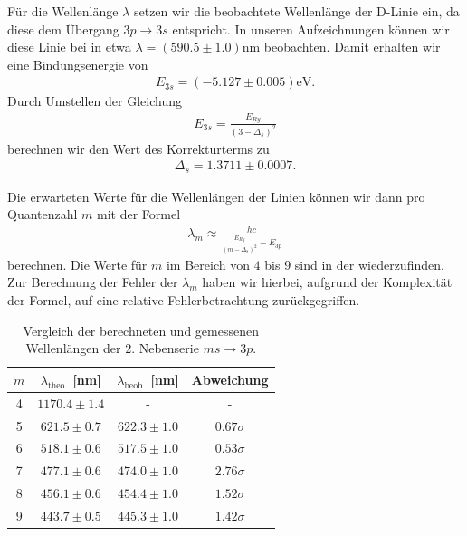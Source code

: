 Für die Wellenlänge $\lambda$ setzen wir die beobachtete Wellenlänge der D-Linie ein, da diese dem Übergang $3p \to 3s$ entspricht. In unseren Aufzeichnungen können wir diese Linie bei in etwa $\lambda = (590.5 \pm 1.0) \si{\nano\meter}$ beobachten. Damit erhalten wir eine Bindungsenergie von
\begin{align}
  E_{3s} = (-5.127 \pm 0.005) \si{\electronvolt}.
\end{align}
Durch Umstellen der Gleichung
\begin{align}
  E_{3s} = \frac{E_{Ry}}{(3 - \Delta_s)^2}
\end{align}
berechnen wir den Wert des Korrekturterms zu
\begin{align}
  \Delta_s = 1.3711 \pm 0.0007.
\end{align}

Die erwarteten Werte für die Wellenlängen der Linien können wir dann pro Quantenzahl $m$ mit der Formel
\begin{align}
  \lambda_m \approx \frac{hc}{\frac{E_{Ry}}{(m - \Delta_s)^2} - E_{3p}}
\end{align}
berechnen. Die Werte für $m$ im Bereich von $4$ bis $9$ sind in der  wiederzufinden. Zur Berechnung der Fehler der $\lambda_m$ haben wir hierbei, aufgrund der Komplexität der Formel, auf eine relative Fehlerbetrachtung zurückgegriffen.

\begin{table}[H]
  \centering
  \caption{Vergleich der berechneten und gemessenen Wellenlängen der 2. Nebenserie $ms \to 3p$.}
  \vspace*{0.5em}
  \begin{tabular}{c c c c}
      \hline
      $m$ & $\lambda_{\text{theo.}}$ [nm] & $\lambda_{\text{beob.}}$ [nm] & Abweichung \\
      \hline
      4  & $1170.4 \pm 1.4$ & -     & -     \\
      5  & $621.5 \pm 0.7$  & $622.3 \pm 1.0$ & $0.67\sigma$ \\
      6  & $518.1 \pm 0.6$  & $517.5 \pm 1.0$ & $0.53\sigma$ \\
      7  & $477.1 \pm 0.6$  & $474.0 \pm 1.0$ & $2.76\sigma$ \\
      8  & $456.1 \pm 0.6$  & $454.4 \pm 1.0$ & $1.52\sigma$ \\
      9  & $443.7 \pm 0.5$  & $445.3 \pm 1.0$ & $1.42\sigma$ \\
      \hline
  \end{tabular}
  \label{tab:wellenlaengen_2ns}
\end{table}

